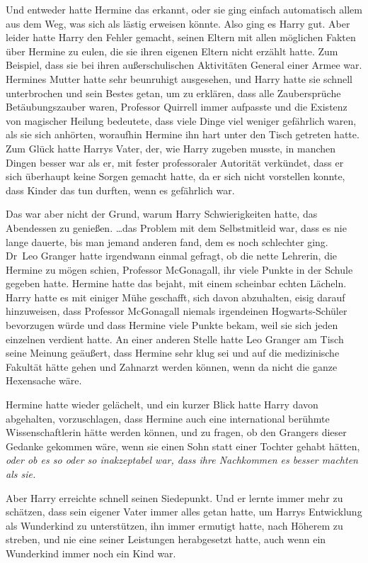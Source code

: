 {Und entweder hatte Hermine das erkannt, oder sie ging einfach automatisch allem aus dem Weg, was sich als lästig erweisen könnte. Also ging es Harry gut. Aber leider hatte Harry den Fehler gemacht, seinen Eltern mit allen möglichen Fakten über Hermine zu eulen, die sie ihren eigenen Eltern nicht erzählt hatte. Zum Beispiel, dass sie bei ihren außerschulischen Aktivitäten General einer Armee war. Hermines Mutter hatte sehr beunruhigt ausgesehen, und Harry hatte sie schnell unterbrochen und sein Bestes getan, um zu erklären, dass alle Zaubersprüche Betäubungszauber waren, Professor Quirrell immer aufpasste und die Existenz von magischer Heilung bedeutete, dass viele Dinge viel weniger gefährlich waren, als sie sich anhörten, woraufhin Hermine ihn hart unter den Tisch getreten hatte. Zum Glück hatte Harrys Vater, der, wie Harry zugeben musste, in manchen Dingen besser war als er, mit fester professoraler Autorität verkündet, dass er sich überhaupt keine Sorgen gemacht hatte, da er sich nicht vorstellen konnte, dass Kinder das tun durften, wenn es gefährlich war.

Das war aber nicht der Grund, warum Harry Schwierigkeiten hatte, das Abendessen zu genießen. …das Problem mit dem Selbstmitleid war, dass es nie lange dauerte, bis man jemand anderen fand, dem es noch schlechter ging. Dr~Leo Granger hatte irgendwann einmal gefragt, ob die nette Lehrerin, die Hermine zu mögen schien, Professor McGonagall, ihr viele Punkte in der Schule gegeben hatte. Hermine hatte das bejaht, mit einem scheinbar echten Lächeln. Harry hatte es mit einiger Mühe geschafft, sich davon abzuhalten, eisig darauf hinzuweisen, dass Professor McGonagall niemals irgendeinen Hogwarts-Schüler bevorzugen würde und dass Hermine viele Punkte bekam, weil sie sich jeden einzelnen verdient hatte. An einer anderen Stelle hatte Leo Granger am Tisch seine Meinung geäußert, dass Hermine sehr klug sei und auf die medizinische Fakultät hätte gehen und Zahnarzt werden können, wenn da nicht die ganze Hexensache wäre.

Hermine hatte wieder gelächelt, und ein kurzer Blick hatte Harry davon abgehalten, vorzuschlagen, dass Hermine auch eine international berühmte Wissenschaftlerin hätte werden können, und zu fragen, ob den Grangers dieser Gedanke gekommen wäre, wenn sie einen Sohn statt einer Tochter gehabt hätten, \emph{oder ob es so oder so inakzeptabel war, dass ihre Nachkommen es besser machten als sie.}

Aber Harry erreichte schnell seinen Siedepunkt. Und er lernte immer mehr zu schätzen, dass sein eigener Vater immer alles getan hatte, um Harrys Entwicklung als Wunderkind zu unterstützen, ihn immer ermutigt hatte, nach Höherem zu streben, und nie eine seiner Leistungen herabgesetzt hatte, auch wenn ein Wunderkind immer noch ein Kind war.

}
